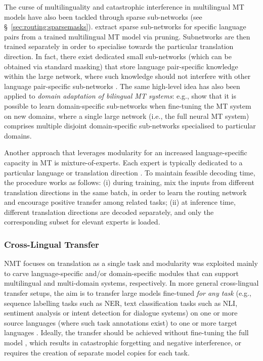 \documentclass[10pt]{article} %
\begin{document}
The curse of multilinguality and catastrophic interference in multilingual MT models have also been tackled through sparse sub-networks (see \S~\ref{sec:routing:sparsemasks}). \citet{lin-etal-2021-learning} extract sparse sub-networks for specific language pairs from a trained multilingual MT model via pruning. Subnetworks are then trained separately in order to specialise towards the particular translation direction. In fact, there exist dedicated small sub-networks (which can be obtained via standard masking) that store language pair-specific knowledge within the large network, where such knowledge should not interfere with other language pair-specific sub-networks \citep{dua-etal-2022-tricks}. The same high-level idea has also been applied to \textit{domain adaptation of bilingual MT systems}: e.g., \citet{Liang:2020aaai} show that it is possible to learn domain-specific sub-networks when fine-tuning the MT system on new domains, where a single large network (i.e., the full neural MT system) comprises multiple disjoint domain-specific sub-networks specialised to particular domains.

Another approach that leverages modularity for an increased language-specific capacity in MT is mixture-of-experts. Each expert is typically dedicated to a particular language or translation direction \citep{kudugunta2021beyond,Costa:2022nllb}. To maintain feasible decoding time, the procedure works as follows: (i) during training, mix the inputs from different translation directions in the same batch, in order to learn the routing network and encourage positive transfer among related tasks; (ii) at inference time, different translation directions are decoded separately, and only the corresponding subset for elevant experts is loaded.
 

\subsubsection{Cross-Lingual Transfer}
\label{sec:xling-transfer}


 




NMT focuses on translation as a single task and modularity was exploited mainly to carve language-specific and/or domain-specific modules that can support multilingual and multi-domain systems, respectively. In more general cross-lingual transfer setups, the aim is to transfer large models \citep{Devlin:2019bert,conneau-etal-2020-unsupervised} fine-tuned \textit{for any task} (e.g., sequence labelling tasks such as NER, text classification tasks such as NLI, sentiment analysis or intent detection for dialogue systems) on one or more source languages (where such task annotations exist) to one or more target languages \citep{Hu:2020xtreme,Ruder:2021xtremer}. Ideally, the transfer should be achieved without fine-tuning the full  model \citep{Hu:2020xtreme}, which  results in catastrophic forgetting and negative interference, or requires the creation of separate model copies for each task.
\end{document}
